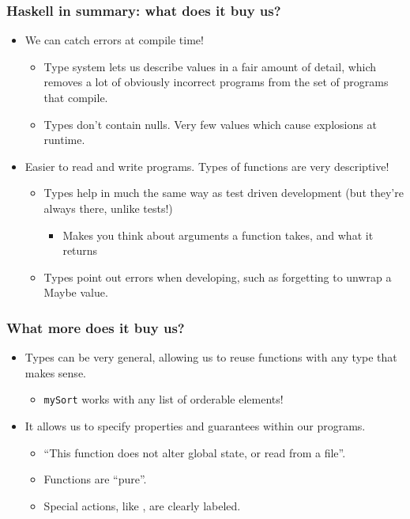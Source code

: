 \documentclass{beamer}
\begin{document}
\begin{frame}
  \frametitle{Haskell in summary: what does it buy us?}

  \begin{itemize}
  \item We can catch errors at compile time!
    \begin{itemize}
    \item Type system lets us describe values in a fair amount of detail, which removes a lot of obviously incorrect programs from the set of programs that compile.
    \item Types don't contain nulls. Very few values which cause explosions at runtime.
    \end{itemize}
  \item Easier to read and write programs. Types of functions are very descriptive!
    \begin{itemize}
    \item Types help in much the same way as test driven development (but they're always there, unlike tests!)
      \begin{itemize}
      \item Makes you think about arguments a function takes, and what it returns
      \end{itemize}
    \item Types point out errors when developing, such as forgetting to unwrap a Maybe value.
    \end{itemize}
  \end{itemize}
\end{frame}

\begin{frame}
  \frametitle{What more does it buy us?}
  \begin{itemize}
  \item Types can be very general, allowing us to reuse functions with any type that makes sense.
    \begin{itemize}
    \item \texttt{mySort} works with any list of orderable elements!
    \end{itemize}
  \item It allows us to specify properties and guarantees within our programs.
    \begin{itemize}
    \item ``This function does not alter global state, or read from a file''.
    \item Functions are ``pure''.
    \item Special actions, like , are clearly labeled.
    \end{itemize} 
  \end{itemize}
\end{frame}
\end{document}
